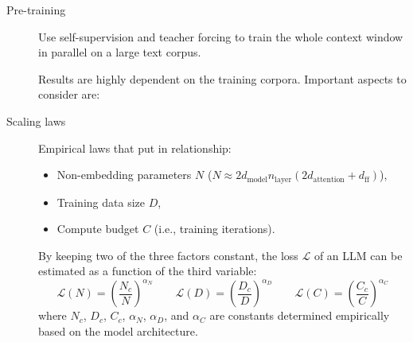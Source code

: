 \begin{description}
    \item[Pre-training] 
        Use self-supervision and teacher forcing to train the whole context window in parallel on a large text corpus.

        \begin{remark}
            Results are highly dependent on the training corpora. Important aspects to consider are:
        \end{remark}

    \item[Scaling laws] 
        Empirical laws that put in relationship:
        \begin{itemize}
            \item Non-embedding parameters $N$ ($N \approx 2 d_\text{model} n_\text{layer} (2 d_\text{attention} + d_\text{ff})$),
            \item Training data size $D$,
            \item Compute budget $C$ (i.e., training iterations).
        \end{itemize}
        By keeping two of the three factors constant, the loss $\mathcal{L}$ of an LLM can be estimated as a function of the third variable:
        \[ 
            \mathcal{L}(N) = \left( \frac{N_c}{N} \right)^{\alpha_N} 
            \qquad
            \mathcal{L}(D) = \left( \frac{D_c}{D} \right)^{\alpha_D} 
            \qquad
            \mathcal{L}(C) = \left( \frac{C_c}{C} \right)^{\alpha_C} 
        \]
        where $N_c$, $D_c$, $C_c$, $\alpha_N$, $\alpha_D$, and $\alpha_C$ are constants determined empirically based on the model architecture.
\end{description}


